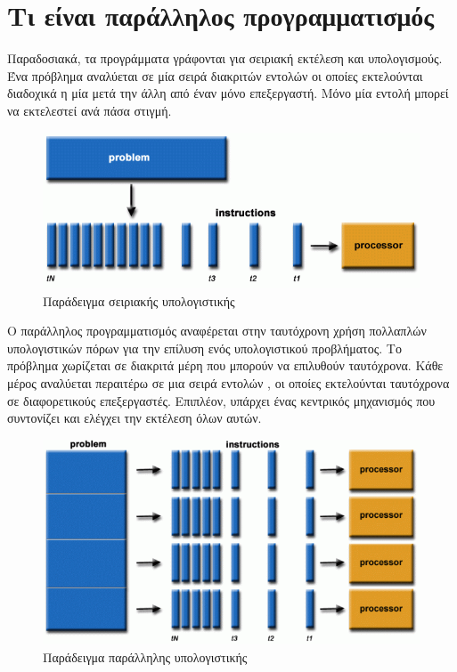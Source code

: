\section{Τι είναι παράλληλος προγραμματισμός}


Παραδοσιακά, τα προγράμματα γράφονται για σειριακή εκτέλεση και υπολογισμούς. Ένα πρόβλημα αναλύεται σε μία σειρά διακριτών εντολών οι οποίες εκτελούνται διαδοχικά η μία μετά την άλλη από έναν μόνο επεξεργαστή. Μόνο μία εντολή μπορεί να εκτελεστεί ανά πάσα στιγμή.

\begin{figure}[h!]
    \centering
    \includegraphics[scale=0.45]{images/Ch3/serial-execution.png}
    \caption{Παράδειγμα σειριακής υπολογιστικής}
    \label{fig:serial problem}
\end{figure}

Ο παράλληλος προγραμματισμός αναφέρεται στην ταυτόχρονη χρήση πολλαπλών υπολογιστικών πόρων για την επίλυση ενός υπολογιστικού προβλήματος. Το πρόβλημα χωρίζεται σε διακριτά μέρη που μπορούν να επιλυθούν ταυτόχρονα. Κάθε μέρος αναλύεται περαιτέρω σε μια σειρά εντολών , οι οποίες εκτελούνται ταυτόχρονα σε διαφορετικούς επεξεργαστές.  Επιπλέον, υπάρχει ένας κεντρικός μηχανισμός που συντονίζει και ελέγχει την εκτέλεση όλων αυτών.\cite{llnl}

\begin{figure}[h!]
    \centering
    \includegraphics[scale=0.4]{images/Ch3/parallel-execution.png}
    \caption{Παράδειγμα παράλληλης υπολογιστικής}
    \label{fig:parallel problem}
\end{figure}

